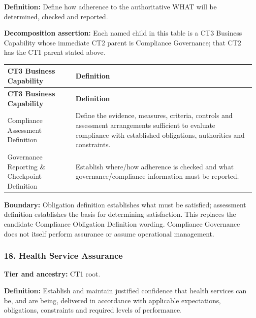 \textbf{Definition:} Define how adherence to the authoritative WHAT will be determined, checked and reported.

\label{rad:business:1024}

\textbf{Decomposition assertion:} Each named child in this table is a CT3 Business Capability whose immediate CT2 parent is Compliance Governance; that CT2 has the CT1 parent stated above.

\label{rad:business:1026}
\begingroup\small\setlength{\TableWidth}{\dimexpr\linewidth-4\tabcolsep-3\arrayrulewidth\relax}
\begin{longtable}{|>{\raggedright\arraybackslash}p{0.35\TableWidth}|>{\raggedright\arraybackslash}p{0.65\TableWidth}|}
\hline\rowcolor{TableHead}\textbf{CT3 Business Capability} & \textbf{Definition}\\\hline\endfirsthead
\hline\rowcolor{TableHead}\textbf{CT3 Business Capability} & \textbf{Definition}\\\hline\endhead
\hline\endfoot
Compliance Assessment Definition & Define the evidence, measures, criteria, controls and assessment arrangements sufficient to evaluate compliance with established obligations, authorities and constraints.\\\hline
Governance Reporting \& Checkpoint Definition & Establish where/\allowbreak{}how adherence is checked and what governance/\allowbreak{}compliance information must be reported.\\\hline
\end{longtable}\endgroup
{}\label{rad:business:1031}

\textbf{Boundary:} Obligation definition establishes what must be satisfied; assessment definition establishes the basis for determining satisfaction. This replaces the candidate Compliance Obligation Definition wording. Compliance Governance does not itself perform assurance or assume operational management.

\label{rad:business:1033}
\subsubsection*{18. Health Service Assurance}
\label{rad:business:1035}

\textbf{Tier and ancestry:} CT1 root.

\label{rad:business:1037}

\textbf{Definition:} Establish and maintain justified confidence that health services can be, and are being, delivered in accordance with applicable expectations, obligations, constraints and required levels of performance.

